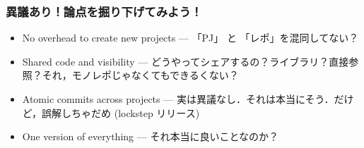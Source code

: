 
\begin{frame}
    \frametitle{異議あり！論点を掘り下げてみよう！}
    \begin{itemize}
        \item No overhead to create new projects --- 「PJ」 と 「レポ」を混同してない？
        \item Shared code and visibility --- どうやってシェアするの？ライブラリ？直接参照？それ，モノレポじゃなくてもできるくない？
        \item Atomic commits across projects --- 実は異議なし．それは本当にそう．だけど，誤解しちゃだめ (lockstep リリース)
        \item One version of everything --- それ本当に良いことなのか？
    \end{itemize}
\end{frame}